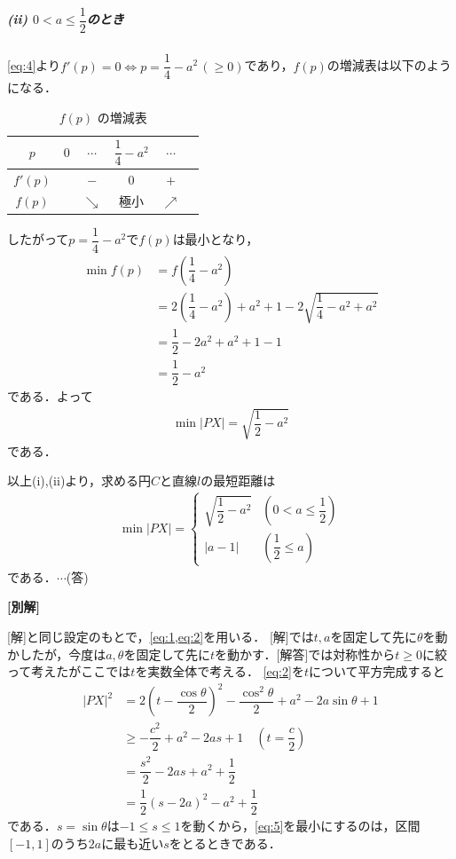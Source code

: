 \documentclass[../../main.tex]{subfiles}
\begin{document}
\subparagraph{(ii) $0<a\le\dfrac{1}{2}$のとき}

\cref{eq:4}より$f'(p)=0\iff p=\dfrac{1}{4}-a^2\,(\ge0)$であり，$f(p)$の増減表は以下のようになる．

\begin{table}[htb]
  \centering
  \caption{$f(p)$ の増減表}
  \begin{tabular}{c|ccccc}
    $p$ & $0$ & $\cdots$ & $\dfrac{1}{4}-a^2$ & $\cdots$ \\
    \hline
    $f'(p)$ & & $-$ & $0$ & $+$ \\
    \hline
    $f(p)$ & & $\searrow$ & 極小 & $\nearrow$
  \end{tabular}
\end{table}

したがって$p=\dfrac{1}{4}-a^2$で$f(p)$は最小となり，
\begin{align}
  \min f(p)
  &=f\left(\dfrac{1}{4}-a^2\right) \\
  &=2\left(\dfrac{1}{4}-a^2\right)+a^2+1-2\sqrt{\dfrac{1}{4}-a^2+a^2} \\
  &=\dfrac{1}{2}-2a^2+a^2+1-1 \\
  &=\dfrac{1}{2}-a^2
\end{align}
である．よって
\begin{align}
  \min|PX|=\sqrt{\dfrac{1}{2}-a^2}
\end{align}
である．
\casesend

以上(i),(ii)より，求める円$C$と直線$l$の最短距離は
\begin{align}
  \min|PX|=
  \begin{cases}
    \sqrt{\dfrac{1}{2}-a^2} & \left(0<a\le\dfrac{1}{2}\right) \\
    |a-1| & \left(\dfrac{1}{2}\le a\right)
  \end{cases}
\end{align}
である．$\cdots$(答)

{\bf [別解]}

[解]と同じ設定のもとで，\cref{eq:1,eq:2}を用いる．
[解]では$t,a$を固定して先に$\theta$を動かしたが，今度は$a,\theta$を固定して先に$t$を動かす．[解答]では対称性から$t \ge 0$に絞って考えたがここでは$t$を実数全体で考える．
\cref{eq:2}を$t$について平方完成すると
\begin{align}
  |PX|^2
  & =2\left(t-\dfrac{\cos\theta}{2}\right)^2-\dfrac{\cos^2\theta}{2}+a^2-2a\sin\theta+1 \\
  & \ge -\dfrac{c^2}{2}+a^2-2as+1 \quad \left(t=\dfrac{c}{2}\right)\\
  & =\dfrac{s^2}{2}-2as+a^2+\dfrac{1}{2} \\
  & =\dfrac{1}{2}(s-2a)^2-a^2+\dfrac{1}{2} \label{eq:5}
\end{align}
である．$s=\sin\theta$は$-1\le s\le1$を動くから，\cref{eq:5}を最小にするのは，区間$[-1,1]$のうち$2a$に最も近い$s$をとるときである．
\end{document}
